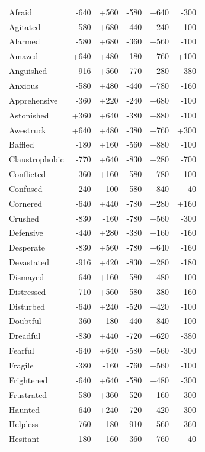 \begin{longtable}{@{}p{}rrrrr}
Afraid & -640 & +560 & -580 & +640 & -300 \\
Agitated & -580 & +680 & -440 & +240 & -100 \\
Alarmed & -580 & +680 & -360 & +560 & -100 \\
Amazed & +640 & +480 & -180 & +760 & +100 \\
Anguished & -916 & +560 & -770 & +280 & -380 \\
Anxious & -580 & +480 & -440 & +780 & -160 \\
Apprehensive & -360 & +220 & -240 & +680 & -100 \\
Astonished & +360 & +640 & -380 & +880 & -100 \\
Awestruck & +640 & +480 & -380 & +760 & +300 \\
Baffled & -180 & +160 & -560 & +880 & -100 \\
Claustrophobic & -770 & +640 & -830 & +280 & -700 \\
Conflicted & -360 & +160 & -580 & +780 & -100 \\
Confused & -240 & -100 & -580 & +840 & -40 \\
Cornered & -640 & +440 & -780 & +280 & +160 \\
Crushed & -830 & -160 & -780 & +560 & -300 \\
Defensive & -440 & +280 & -380 & +160 & -160 \\
Desperate & -830 & +560 & -780 & +640 & -160 \\
Devastated & -916 & +420 & -830 & +280 & -180 \\
Dismayed & -640 & +160 & -580 & +480 & -100 \\
Distressed & -710 & +560 & -580 & +380 & -160 \\
Disturbed & -640 & +240 & -520 & +420 & -100 \\
Doubtful & -360 & -180 & -440 & +840 & -100 \\
Dreadful & -830 & +440 & -720 & +620 & -380 \\
Fearful & -640 & +640 & -580 & +560 & -300 \\
Fragile & -380 & -160 & -760 & +560 & -100 \\
Frightened & -640 & +640 & -580 & +480 & -300 \\
Frustrated & -580 & +360 & -520 & -160 & -300 \\
Haunted & -640 & +240 & -720 & +420 & -300 \\
Helpless & -760 & -180 & -910 & +560 & -360 \\
Hesitant & -180 & -160 & -360 & +760 & -40 \\

\end{longtable}
